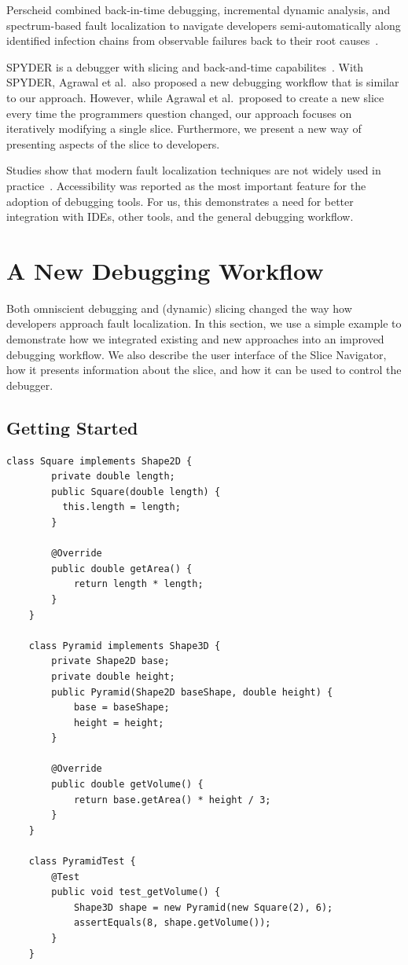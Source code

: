 \documentclass[
			english,
			review,
			]{elsarticle}
\begin{document}
Perscheid combined back-in-time debugging, incremental dynamic analysis, and spectrum-based fault localization to navigate developers semi-automatically along identified infection chains from observable failures back to their root causes~\cite{perscheid_testdriven_2013}.

SPYDER is a debugger with slicing and back-and-time capabilites~\cite{agrawal_debugging_1993}.
With SPYDER, Agrawal et al.\ also proposed a new debugging workflow that is similar to our approach.
However, while Agrawal et al.\ proposed to create a new slice every time the programmers question changed, our approach focuses on iteratively modifying a single slice.
Furthermore, we present a new way of presenting aspects of the slice to developers.

Studies show that modern fault localization techniques are not widely used in practice~\cite{perscheid_studying_2017}.
Accessibility was reported as the most important feature for the adoption of debugging tools.
For us, this demonstrates a need for better integration with IDEs, other tools, and the general debugging workflow.

\section{A New Debugging Workflow}
\label{sec:workflow}

Both omniscient debugging and (dynamic) slicing changed the way how developers approach fault localization.
In this section, we use a simple example to demonstrate how we integrated existing and new approaches into an improved debugging workflow.
We also describe the user interface of the Slice Navigator, how it presents information about the slice, and how it can be used to control the debugger.

\subsection{Getting Started}

\begin{lstlisting}[float,label=lst:example,caption={Example program with a failing test case}]
	class Square implements Shape2D {
		private double length;
		public Square(double length) { 
		  this.length = length;
		}
		
		@Override
		public double getArea() { 
			return length * length;
		}
	}
	
	class Pyramid implements Shape3D {
		private Shape2D base;
		private double height;
		public Pyramid(Shape2D baseShape, double height) {
			base = baseShape;
			height = height;
		}
		
		@Override
		public double getVolume() { 
			return base.getArea() * height / 3; 
		}
	}
	
	class PyramidTest {
		@Test
		public void test_getVolume() {
			Shape3D shape = new Pyramid(new Square(2), 6);
			assertEquals(8, shape.getVolume());
		}
	}
\end{lstlisting}
\end{document}
